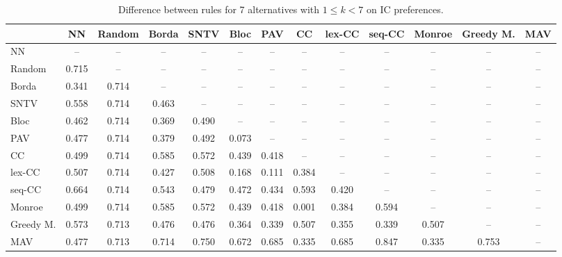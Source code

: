 
\begin{table*}[htbp]
\centering
\begin{tabular}{lcccccccccccc}
\toprule
 & NN & Random & Borda & SNTV & Bloc & PAV & CC & lex-CC & seq-CC & Monroe & Greedy M. & MAV \\
\midrule
NN & -- & -- & -- & -- & -- & -- & -- & -- & -- & -- & -- & -- \\
Random & \cellcolor{blue!71} 0.715 & -- & -- & -- & -- & -- & -- & -- & -- & -- & -- & -- \\
Borda & \cellcolor{blue!34} 0.341 & \cellcolor{blue!71} 0.714 & -- & -- & -- & -- & -- & -- & -- & -- & -- & -- \\
SNTV & \cellcolor{blue!55} 0.558 & \cellcolor{blue!71} 0.714 & \cellcolor{blue!46} 0.463 & -- & -- & -- & -- & -- & -- & -- & -- & -- \\
Bloc & \cellcolor{blue!46} 0.462 & \cellcolor{blue!71} 0.714 & \cellcolor{blue!36} 0.369 & \cellcolor{blue!49} 0.490 & -- & -- & -- & -- & -- & -- & -- & -- \\
PAV & \cellcolor{blue!47} 0.477 & \cellcolor{blue!71} 0.714 & \cellcolor{blue!37} 0.379 & \cellcolor{blue!49} 0.492 & \cellcolor{blue!7} 0.073 & -- & -- & -- & -- & -- & -- & -- \\
CC & \cellcolor{blue!49} 0.499 & \cellcolor{blue!71} 0.714 & \cellcolor{blue!58} 0.585 & \cellcolor{blue!57} 0.572 & \cellcolor{blue!43} 0.439 & \cellcolor{blue!41} 0.418 & -- & -- & -- & -- & -- & -- \\
lex-CC & \cellcolor{blue!50} 0.507 & \cellcolor{blue!71} 0.714 & \cellcolor{blue!42} 0.427 & \cellcolor{blue!50} 0.508 & \cellcolor{blue!16} 0.168 & \cellcolor{blue!11} 0.111 & \cellcolor{blue!38} 0.384 & -- & -- & -- & -- & -- \\
seq-CC & \cellcolor{blue!66} 0.664 & \cellcolor{blue!71} 0.714 & \cellcolor{blue!54} 0.543 & \cellcolor{blue!47} 0.479 & \cellcolor{blue!47} 0.472 & \cellcolor{blue!43} 0.434 & \cellcolor{blue!59} 0.593 & \cellcolor{blue!42} 0.420 & -- & -- & -- & -- \\
Monroe & \cellcolor{blue!49} 0.499 & \cellcolor{blue!71} 0.714 & \cellcolor{blue!58} 0.585 & \cellcolor{blue!57} 0.572 & \cellcolor{blue!43} 0.439 & \cellcolor{blue!41} 0.418 & \cellcolor{blue!0} 0.001 & \cellcolor{blue!38} 0.384 & \cellcolor{blue!59} 0.594 & -- & -- & -- \\
Greedy M. & \cellcolor{blue!57} 0.573 & \cellcolor{blue!71} 0.713 & \cellcolor{blue!47} 0.476 & \cellcolor{blue!47} 0.476 & \cellcolor{blue!36} 0.364 & \cellcolor{blue!33} 0.339 & \cellcolor{blue!50} 0.507 & \cellcolor{blue!35} 0.355 & \cellcolor{blue!33} 0.339 & \cellcolor{blue!50} 0.507 & -- & -- \\
MAV & \cellcolor{blue!47} 0.477 & \cellcolor{blue!71} 0.713 & \cellcolor{blue!71} 0.714 & \cellcolor{blue!75} 0.750 & \cellcolor{blue!67} 0.672 & \cellcolor{blue!68} 0.685 & \cellcolor{blue!33} 0.335 & \cellcolor{blue!68} 0.685 & \cellcolor{blue!84} 0.847 & \cellcolor{blue!33} 0.335 & \cellcolor{blue!75} 0.753 & -- \\
\bottomrule
\end{tabular}

\caption{Difference between rules for 7 alternatives with $1 \leq k < 7$ on IC preferences.}
\label{tab:rule_distance_heatmap-m=[7]-pref_dist=IC}
\end{table*}
    